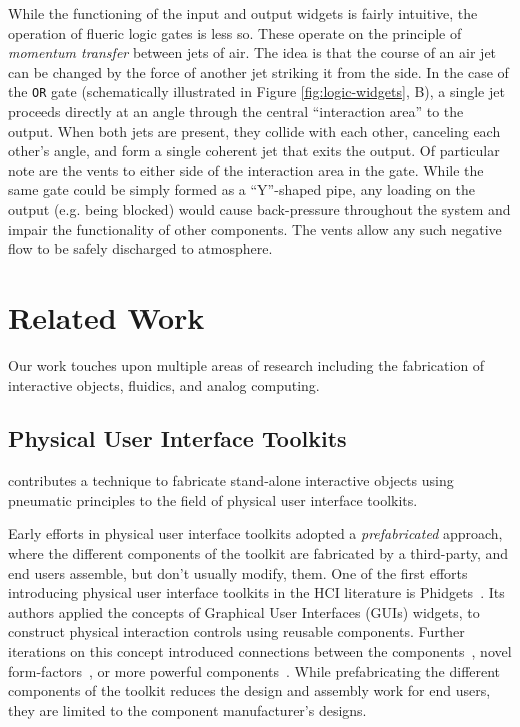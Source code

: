     While the functioning of the input and output widgets is fairly
    intuitive, the operation of flueric logic gates is less so.
    These operate on the principle of \textit{momentum transfer}
    between jets of air. The idea is that the course of an air jet
    can be changed by the force of another jet striking it from the
    side. In the case of the \texttt{OR} gate (schematically
    illustrated in Figure \ref{fig:logic-widgets}, B), a single jet proceeds
    directly at an angle through the central ``interaction area'' to the
    output. When both jets are present, they collide with each other,
    canceling each other's angle, and form a single coherent jet that exits
    the output. Of particular note are the vents to either side of the
    interaction area in the gate. While the same gate could be simply
    formed as a ``Y''-shaped pipe, any loading on the output (e.g. being
    blocked) would cause back-pressure throughout the system and impair the
    functionality of other components. The vents allow any such negative
    flow to be safely discharged to atmosphere.

  \section{Related Work}
    Our work touches upon multiple areas of research including the
    fabrication of interactive objects, fluidics, and analog computing.

      \subsection{Physical User Interface Toolkits}
        \al contributes a technique to fabricate stand-alone interactive
        objects using pneumatic principles to the field of physical user
        interface toolkits.

        Early efforts in physical user interface toolkits adopted a
        \emph{prefabricated} approach, where the different components of
        the toolkit are fabricated by a third-party, and end users
        assemble, but don't usually modify, them. One of the first efforts
        introducing physical user interface toolkits in the HCI literature
        is Phidgets~\cite{Greenberg:2001}. Its authors applied the concepts
        of Graphical User Interfaces (GUIs) widgets, to construct physical
        interaction controls using reusable components. Further iterations
        on this concept introduced connections between the
        components~\cite{Bdeir:2009}, novel
        form-factors~\cite{Hodges:2014}, or more powerful
        components~\cite{Villar:2012}. While prefabricating the different
        components of the toolkit reduces the design and assembly work for
        end users, they are limited to the component manufacturer's
        designs.
        
